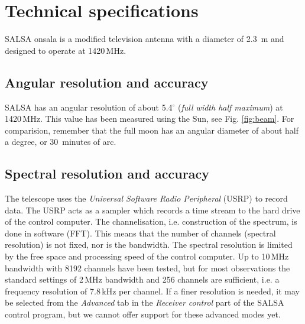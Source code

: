 \chapter{Technical specifications}
\label{chap:tech}
SALSA onsala is a modified television antenna with a diameter of 2.3~m and designed
to operate at 1420\,MHz.

\section{Angular resolution and accuracy}
\label{sect:ares}
SALSA has an angular resolution of about 5.4$^\circ$ (\emph{full width half
maximum}) at 1420\,MHz. This value has been measured using the Sun, see Fig.
\ref{fig:beam}. For comparision, remember that the full moon has an angular
diameter of about half a degree, or 30~minutes of arc.

\section{Spectral resolution and accuracy}
The telescope uses the \emph{Universal Software Radio Peripheral} (USRP) to
record data. The USRP acts as a sampler which records a time stream to the hard
drive of the control computer. The channelisation, i.e. construction of the
spectrum, is done in software (FFT). This means that the number of channels
(spectral resolution) is not fixed, nor is the bandwidth. The spectral
resolution is limited by the free space and processing speed of the control
computer. Up to 10\,MHz bandwidth with 8192 channels have been tested, but for
most observations the standard settings of 2\,MHz bandwidth and 256 channels
are sufficient, i.e. a frequency resolution of 7.8\,kHz per channel. If a finer
resolution is needed, it may be selected from the \emph{Advanced} tab in the
\emph{Receiver control} part of the SALSA control program, but we cannot offer
support for these advanced modes yet.
